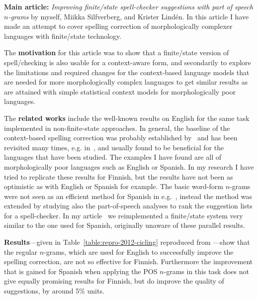 \documentclass[officiallayout]{unihelcompling}
\begin{document}
\textbf{Main article:} \emph{Improving finite\-/state spell-checker suggestions
with part of speech \(n\)-grams} by myself, Miikka Silfverberg, and Krister
Lindén. In this article I have made an attempt to cover spelling correction
of morphologically complexer languages with finite\-/state technology.

The \textbf{motivation} for this article was to show that a finite\-/state
version of spell\-/checking is also usable for a context-aware form, and
secondarily to explore the limitations and required changes for the
context-based language models that are needed for more morphologically complex
languages to get similar results as are attained with simple statistical
context models for morphologically poor languages.

The \textbf{related works} include the well-known results on English for the
same task implemented in non-finite-state approaches.  In general, the baseline of the
context-based spelling correction was probably established
by~\citet{mays1991context} and has been revisited many times, e.g.
in~\citet{wilcox-ohearn2008realword}, and usually found to be beneficial for
the languages that have been studied. The examples I have found are all of
morphologically poor languages such as English or Spanish. In my research I
have tried to replicate these results for Finnish, but the results have not
been as optimistic as with English or Spanish for example.  The basic word-form
\(n\)-grams were not seen as an efficient method for Spanish in
e.g.~\citet{otero2007contextual}, instead the method was extended by studying
also the part-of-speech analyses to rank the suggestion lists for a
spell-checker. In my article~ we reimplemented
a finite\-/state system very similar to the one used for Spanish, originally
unaware of these parallel results.

\textbf{Results}---given in Table~\ref{table:repro-2012-cicling} reproduced
from ---show that the regular \(n\)-grams, which
are used for English to successfully improve the spelling correction, are not
so effective for Finnish.  Furthermore the improvement that is gained for
Spanish when applying the POS \(n\)-grams in this task does not give equally
promising results for Finnish, but do improve the quality of suggestions, by
around 5\% units.
\end{document}
